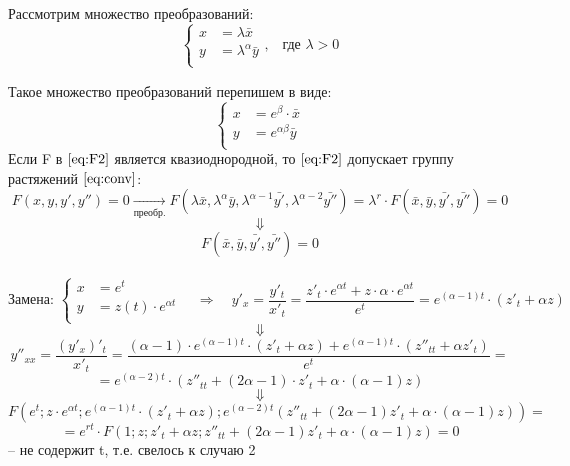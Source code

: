 \begin{corollary}
\begin{enumerate}
		  Рассмотрим множество преобразований:
		  \begin{equation} \label{eq:conv}
		  \left\{
		  \begin{aligned} 
		  	x &= \lambda \bar{x}  \\
		  	y &= \lambda^{\alpha} \bar{y}\\   
		  \end{aligned}
		  \right.\text{,}  \quad  \text{где } \lambda > 0                                            
		  \end{equation}

		  Такое множество преобразований перепишем в виде: 
		 \[
			\left\{
			\begin{aligned}
				x &= e^{\beta} \cdot \bar{x}  \\
				y &= e^{\alpha \beta} \bar{y} \\   
			\end{aligned}
			\right.                                                          
		\]
		Если F в $\eqref{eq:F2}$ является квазиоднородной, то $\eqref{eq:F2}$ допускает группу растяжений $\eqref{eq:conv}$: \\
		\[
			\boxed{F(x, y, y', y'') = 0} \xrightarrow[\text{преобр.}]{} F(\lambda \bar{x}, \lambda^{\alpha} \bar{y}, \lambda^{\alpha - 1} \bar{y'}, \lambda^{\alpha - 2} \bar{y''}) = \lambda^{r} \cdot F(\bar{x}, \bar{y}, \bar{y'}, \bar{y''}) = 0
		\]
		\[
			\Downarrow
		\]
		\[
		 	F(\bar{x}, \bar{y}, \bar{y'}, \bar{y''}) = 0
		\]
		\ \\
	    \[
		\text{Замена: }\left\{
		\begin{aligned}
			x &= e^{t}  \\
			y &= z(t) \cdot e^{\alpha t}\\   
		\end{aligned}
		\right. \quad
		\Rightarrow  \quad y'_x = \frac{y'_t}{x'_t} = \frac{z'_t \cdot e^{\alpha t} +  z \cdot \alpha \cdot e^{\alpha t}}{e^t} =  e^{(\alpha  -  1)t} \cdot (z'_t  + \alpha z)                                              
		\]
		\[
		  \Downarrow
		\]
		\[
			y''_{xx} = \frac{(y'_x)'_t}{x'_t} = \frac{(\alpha - 1) \cdot e^{(\alpha - 1)t} \cdot (z'_t + \alpha z) + e^{(\alpha - 1)t} \cdot (z''_{tt} + \alpha z'_t)}{e^t} = 
		\]	
		\[	
			= e^{(\alpha - 2)t} \cdot (z''_{tt} + (2\alpha - 1)\cdot z'_t + \alpha \cdot (\alpha - 1)z)
		\]
		\[
		  \Downarrow
		\]
		\[
			F(e^t; z \cdot e^{\alpha t}; e^{(\alpha - 1)t} \cdot (z'_t + \alpha z); e^{(\alpha - 2)t}(z''_{tt} + (2\alpha - 1)z'_t + \alpha \cdot (\alpha - 1)z) ) =
		\]
		\[
			= e^{rt} \cdot F(1; z; z'_t + \alpha z; z''_{tt} + (2\alpha - 1)z'_t + \alpha \cdot (\alpha - 1)z) = 0
		\]
		-- не содержит t, т.е. свелось к случаю 2
	\end{enumerate}
\end{corollary}

